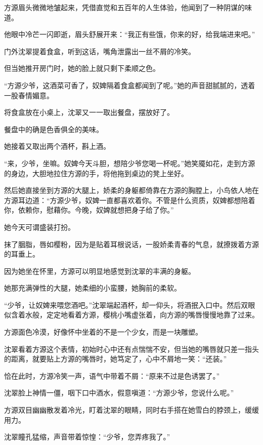 
\begin{this_body}

方源眉头微微地皱起来，凭借直觉和五百年的人生体验，他闻到了一种阴谋的味道。

他眼中冷芒一闪即逝，眉头舒展开来：“我正有些饿，你来的好，给我端进来吧。”

门外沈翠提着食盒，听到这话，嘴角泄露出一丝不屑的冷笑。

但当她推开房门时，她的脸上就只剩下柔顺之色。

“方源少爷，这酒菜可香了，奴婢隔着食盒都闻到了呢。”她的声音甜腻腻的，透着一股春情媚意。

将食盒放在小桌上，沈翠又一一取出餐盘，摆放好了。

餐盘中的确是色香俱全的美味。

她接着又取出两个酒杯，斟上酒。

“来，少爷，坐嘛。奴婢今天斗胆，想陪少爷您喝一杯呢。”她笑魇如花，走到方源的身边，大胆地拉住方源的手，将他拖到桌边的凳上坐好。

然后她直接坐到方源的大腿上，娇柔的身躯都倚靠在方源的胸膛上，小鸟依人地在方源耳边道：“方源少爷，奴婢一直都喜欢着你。不管是什么资质，奴婢都想陪着你，依赖你，慰藉你。今晚，奴婢就想把身子给了你。”

她今天可谓盛装打扮。

抹了胭脂，唇如樱粉，因为是贴着耳根说话，一股娇柔青春的气息，就撩拨着方源的耳垂上。

因为她坐在怀里，方源可以明显地感觉到沈翠的丰满的身躯。

她那充满弹性的大腿，她柔细的小蛮腰，她胸前的柔软。

“少爷，让奴婢来喂您酒吧。”沈翠端起酒杯，却一仰头，将酒抿入口中。然后双眼似含着水般，定定地看着方源，樱桃小嘴虚张着，向方源的嘴唇慢慢地靠了过来。

方源面色冷漠，好像怀中坐着的不是一个少女，而是一块雕塑。

沈翠看着方源这个表情，初始时心中还有点惴惴不安，但当她的嘴唇就只差一指头的距离，就要贴上方源的嘴唇时，她笃定了，心中不屑地一笑：“还装。”

恰在此时，方源冷笑一声，语气中带着不屑：“原来不过是色诱罢了。”

沈翠脸上神情一僵，咽下口中酒水，假意嗔道：“方源少爷，您说什么呢。”

方源双目幽幽散发着冷光，盯着沈翠的眼睛，同时右手搭在她雪白的脖颈上，缓缓用力。

沈翠瞳孔猛缩，声音带着惊惶：“少爷，您弄疼我了。”


\end{this_body}
